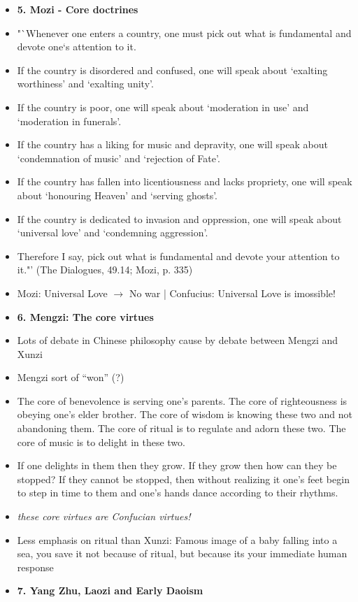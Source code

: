 \documentclass[emulatestandardclasses]{scrartcl}
\begin{document}
\begin{itemize}
  \item \textbf{5. Mozi - Core doctrines}
  \item "`Whenever one enters a country, one must pick out what is fundamental and devote one`s attention to it.
  \item If the country is disordered and confused, one will speak about `exalting worthiness' and `exalting unity'.
  \item If the country is poor, one will speak about `moderation in use' and `moderation in funerals'.
  \item If the country has a liking for music and depravity, one will speak about `condemnation of music' and `rejection of Fate'.
  \item If the country has fallen into licentiousness and lacks propriety, one will speak about `honouring Heaven' and `serving ghosts'.
  \item If the country is dedicated to invasion and oppression, one will speak about `universal love' and `condemning aggression'.
  \item Therefore I say, pick out what is fundamental and devote your attention to it."' (The Dialogues, 49.14; Mozi, p. 335)
  \item Mozi: Universal Love $\rightarrow$ No war | Confucius: Universal Love is imossible!
  \item \textbf{6. Mengzi: The core virtues}
  \item Lots of debate in Chinese philosophy cause by debate between Mengzi and Xunzi
  \item Mengzi sort of "`won"' (?)
  \item The core of benevolence is serving one’s parents. The core of righteousness is obeying one’s elder brother. The core of wisdom is knowing these two and not abandoning them. The core of ritual is to regulate and adorn these two. The core of music is to delight in these two.
  \item If one delights in them then they grow. If they grow then how can they be stopped? If they cannot be stopped, then without realizing it one’s feet begin to step in time to them and one’s hands dance according to their rhythms. 
  \item \emph{these core virtues are Confucian virtues!}
  \item Less emphasis on ritual than Xunzi: Famous image of a baby falling into a sea, you save it not because of ritual, but because its your immediate human response
  \item \textbf{7. Yang Zhu, Laozi and Early Daoism}

\end{itemize}
\end{document}

